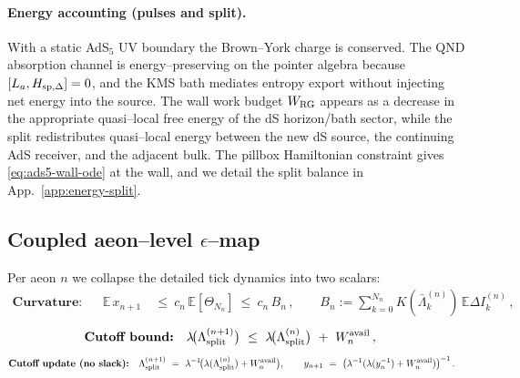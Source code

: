 \documentclass[10pt]{article}
\theoremstyle{definition}
\theoremstyle{plain}
\begin{document}
\paragraph{Energy accounting (pulses and split).}\label{par:uom-main-159}
With a static AdS$_5$ UV boundary the Brown--York charge is conserved. The QND absorption channel is
energy--preserving on the pointer algebra because $[L_a,H_{{\rm sp},\Delta}]=0$, and the KMS bath
mediates entropy export without injecting net energy into the source. The wall work budget $W_{\rm RG}$
appears as a decrease in the appropriate quasi--local free energy of the dS horizon/bath sector,
while the split redistributes quasi--local energy between the new dS source, the continuing AdS receiver,
and the adjacent bulk. The pillbox Hamiltonian constraint gives \eqref{eq:ads5-wall-ode} at the wall,
and we detail the split balance in App.~\ref{app:energy-split}.


\subsection{\texorpdfstring{Coupled aeon--level $\epsilon$--map}{Coupled aeon--level epsilon-map}}
\label{subsec:ads5-coupled-map}

Per aeon $n$ we collapse the detailed tick dynamics into two scalars:
\begin{equation}
\label{eq:ads5-curv-map}
\begin{aligned}
\textbf{Curvature:}&&\mathbb E\,x_{n+1}&\ \le\ c_n\,\mathbb E[\Theta_{N_n}]\ \le\ c_n\,B_n\,,\qquad
B_n:=\sum_{k=0}^{N_n}K(\bar\Lambda_k^{(n)})\,\mathbb E\Delta I_k^{(n)}\,,
\end{aligned}
\end{equation}
\begin{equation}
\label{eq:ads5-cutoff-bound}
\begin{aligned}
\textbf{Cutoff bound:}&&\lambda\!\big(\Lambda^{(n+1)}_{\rm split}\big)&\ \le\ \lambda\!\big(\Lambda^{(n)}_{\rm split}\big)\ +\ W^{\rm avail}_n\,,
\end{aligned}
\end{equation}
\begin{equation}
\label{eq:ads5-cutoff-map}
\begin{aligned}
\textbf{Cutoff update (no slack):}&&\Lambda^{(n+1)}_{\rm split}&\ =\ \lambda^{-1}\!\big(\lambda(\Lambda^{(n)}_{\rm split})+W^{\rm avail}_n\big),
\qquad y_{n+1}\ =\ \big(\lambda^{-1}(\lambda(y_n^{-1})+W^{\rm avail}_n)\big)^{-1}\,.
\end{aligned}
\end{equation}
\end{document}
